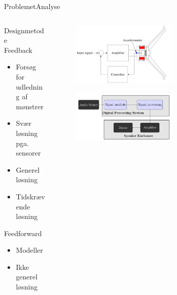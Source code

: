 \begin{frame}{Problemet}{Analyse}
\begin{columns}
\begin{column}{0.3\textwidth}
Designmetode\\
\vspace{5mm}
Feedback
\begin{itemize}
\item Forsøg for udledning af mønstrer 
\item Svær løsning pga. sensorer 
\item Generel løsning
\item Tidskrævende løsning
\end{itemize}
\vspace{5mm}
Feedforward
\begin{itemize}
\item Modeller
\item Ikke generel løsning
\end{itemize}
\end{column}
\begin{column}{0.65\textwidth}
\begin{figure}[H]
\centering
\includegraphics[width=0.6\textwidth]{Feedback_Acc2}
\end{figure}

\begin{figure}[H]
\centering
\includegraphics[width=0.6\textwidth]{feedforward}
\end{figure}

\end{column}
\end{columns}
\end{frame}

